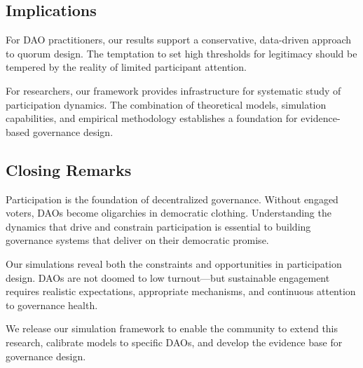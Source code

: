 \subsection{Implications}

For DAO practitioners, our results support a conservative, data-driven approach to quorum design. The temptation to set high thresholds for legitimacy should be tempered by the reality of limited participant attention.

For researchers, our framework provides infrastructure for systematic study of participation dynamics. The combination of theoretical models, simulation capabilities, and empirical methodology establishes a foundation for evidence-based governance design.

\subsection{Closing Remarks}

Participation is the foundation of decentralized governance. Without engaged voters, DAOs become oligarchies in democratic clothing. Understanding the dynamics that drive and constrain participation is essential to building governance systems that deliver on their democratic promise.

Our simulations reveal both the constraints and opportunities in participation design. DAOs are not doomed to low turnout---but sustainable engagement requires realistic expectations, appropriate mechanisms, and continuous attention to governance health.

We release our simulation framework to enable the community to extend this research, calibrate models to specific DAOs, and develop the evidence base for governance design.
